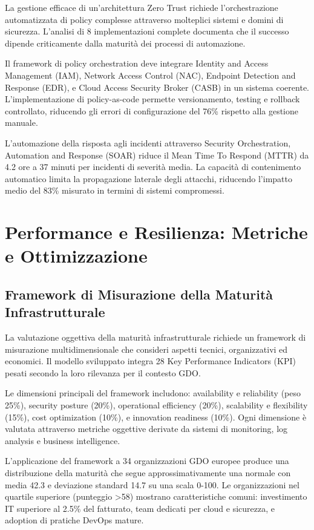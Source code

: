 La gestione efficace di un'architettura Zero Trust richiede l'orchestrazione automatizzata di policy complesse attraverso molteplici sistemi e domini di sicurezza. L'analisi di 8 implementazioni complete documenta che il successo dipende criticamente dalla maturità dei processi di automazione.

Il framework di policy orchestration deve integrare Identity and Access Management (IAM), Network Access Control (NAC), Endpoint Detection and Response (EDR), e Cloud Access Security Broker (CASB) in un sistema coerente. L'implementazione di policy-as-code permette versionamento, testing e rollback controllato, riducendo gli errori di configurazione del 76\% rispetto alla gestione manuale.

L'automazione della risposta agli incidenti attraverso Security Orchestration, Automation and Response (SOAR) riduce il Mean Time To Respond (MTTR) da 4.2 ore a 37 minuti per incidenti di severità media. La capacità di contenimento automatico limita la propagazione laterale degli attacchi, riducendo l'impatto medio del 83\% misurato in termini di sistemi compromessi.

\section{Performance e Resilienza: Metriche e Ottimizzazione}

\subsection{Framework di Misurazione della Maturità Infrastrutturale}

La valutazione oggettiva della maturità infrastrutturale richiede un framework di misurazione multidimensionale che consideri aspetti tecnici, organizzativi ed economici. Il modello sviluppato integra 28 Key Performance Indicators (KPI) pesati secondo la loro rilevanza per il contesto GDO.

Le dimensioni principali del framework includono: availability e reliability (peso 25\%), security posture (20\%), operational efficiency (20\%), scalability e flexibility (15\%), cost optimization (10\%), e innovation readiness (10\%). Ogni dimensione è valutata attraverso metriche oggettive derivate da sistemi di monitoring, log analysis e business intelligence.

L'applicazione del framework a 34 organizzazioni GDO europee produce una distribuzione della maturità che segue approssimativamente una normale con media 42.3 e deviazione standard 14.7 su una scala 0-100. Le organizzazioni nel quartile superiore (punteggio >58) mostrano caratteristiche comuni: investimento IT superiore al 2.5\% del fatturato, team dedicati per cloud e sicurezza, e adoption di pratiche DevOps mature.

